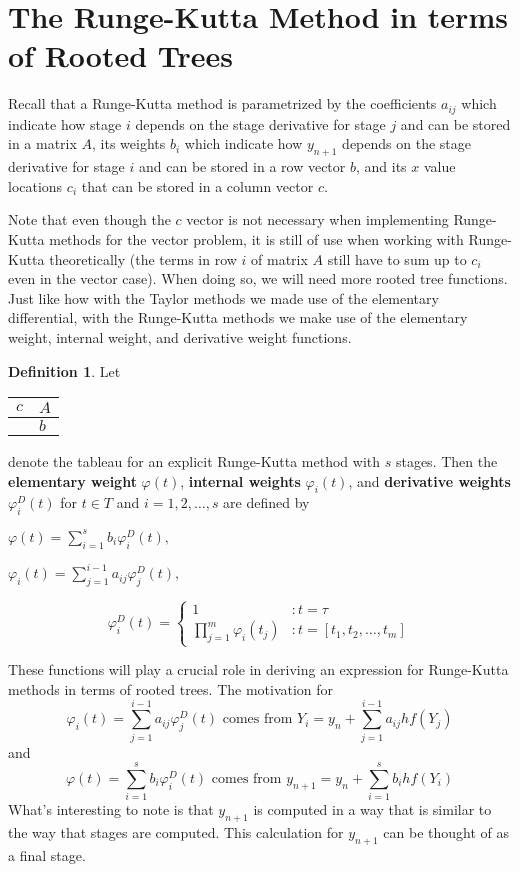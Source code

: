 \documentclass[12pt]{amsart}
\theoremstyle{definition}
\newtheorem*{definition}{Definition}
\begin{document}
  \section{The Runge-Kutta Method in terms of Rooted Trees}
  Recall that a Runge-Kutta method is parametrized by  the coefficients $a_{ij}$ which indicate how stage $i$ depends 
  on the stage derivative for stage $j$ and can be stored in a matrix $A$, its weights $b_i$ which indicate how $y_{n+1}$ 
  depends on the stage derivative for stage $i$ and can be stored in a row vector $b$, 
  and its $x$ value locations $c_i$ that can be stored in a column vector $c$. 
  
  Note that even though the $c$ vector is not necessary when implementing Runge-Kutta methods for the vector problem,
  it is still of use when working with Runge-Kutta theoretically (the terms in row $i$ of matrix $A$ still have to sum up to 
  $c_i$ even in the vector case).  When doing so, we will need more rooted tree functions.
  Just like how with the Taylor methods we made use of the elementary differential, with the Runge-Kutta methods we make
  use of the elementary weight, internal weight, and derivative weight functions.
  
  \begin{definition}
	Let
	\noindent
	\begin{center}
	\begin{tabular}{r | l}
	$c$ & $A$ \\ 
	\hline 
	  & $b$
	\end{tabular}
	\end{center}
	denote the tableau for an explicit Runge-Kutta method with $s$ stages.
	Then the \textbf{elementary weight} $\varphi(t)$, \textbf{internal weights} $\varphi_i(t)$,
	and \textbf{derivative weights} $\varphi_i^D(t)$ for $t \in T$ and $i = 1, 2, \dots, s$
	are defined by
	\begin{multicols}{2}
	\begin{center}
	$\varphi(t) = \sum_{i = 1}^s{b_i\varphi_i^D(t)},$
	\end{center} 
	\columnbreak
	\begin{center}
	$\varphi_i(t) = \sum_{j = 1}^{i - 1}{a_{ij}\varphi_j^D(t)},$
	\end{center}
	\end{multicols}
	$$\varphi_i^D(t) = \left\{ 
	 \begin{array}{ll}
	 1 & : t = \tau \\
	 \prod_{j = 1}^m{\varphi_i(t_j)} & : t = \left[t_1, t_2, \dots, t_m \right]
	 \end{array}
	 \right.$$
  \end{definition}
  These functions will play a crucial role in deriving an expression for Runge-Kutta methods
  in terms of rooted trees. 
  The motivation for
  $$\varphi_i(t) = \sum_{j = 1}^{i - 1}{a_{ij}\varphi_j^D(t)}
  \mbox{ comes from }
  Y_i = y_n + \sum_{j = 1}^{i - 1}{a_{ij}hf(Y_j)}$$
  and
  $$\varphi(t) = \sum_{i = 1}^s{b_i\varphi_i^D(t)}
  \mbox{ comes from }
  y_{n+1} = y_n + \sum_{i = 1}^{s}{b_ihf(Y_i)}$$
  What's interesting to note is that $y_{n + 1}$ is computed in a way that is
  similar to the way that stages are computed. This calculation for $y_{n + 1}$ can be thought of as 
  a final stage.
\end{document}
